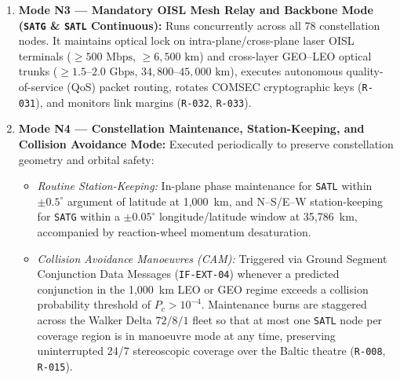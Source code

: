 \documentclass[11pt,a4paper]{article}
\providecommand{\abbr}[1]{#1}
\begin{document}
\begin{enumerate}
\begin{itemize}
        \item \emph{Synchronized Stereoscopic Tracking and Onboard Preliminary 3D Trajectory Computation (\texttt{R-023}):} Both \texttt{SATL} spacecraft track the ascending boost/post-boost vehicle at $20\text{--}50\text{ Hz}$ and exchange GNSS-synchronized timestamped \abbr{LOS} unit vectors and attitude/position covariance matrices over the $1,550\text{ nm}$ laser \abbr{OISL} mesh. This enables the primary \texttt{SATL} node to compute a real-time \emph{Onboard Preliminary Trajectory} estimate via dual-satellite stereoscopic triangulation (\texttt{R-023}).
        \item \emph{Encrypted Dual-Product Downlink (\texttt{R-012}, \texttt{R-023}, \texttt{R-033}):} Both cued \texttt{SATL} nodes stream their timestamped \emph{LEO Observation Packages} together with the \emph{Onboard Preliminary Trajectory} estimate via direct ground downlink or cross-layer \abbr{OISL} relay to the Ground Segment Data Processing System (\texttt{123456.02.04}) for authoritative multi-sensor ground fusion and automated preliminary warning dispatch within $\le 60\text{ s}$ end-to-end (\texttt{R-011}, \texttt{R-026}, \texttt{R-027}, \texttt{R-045}).
    \end{itemize}
    \item \textbf{Mode N3 --- Mandatory \abbr{OISL} Mesh Relay and Backbone Mode (\texttt{SATG} \& \texttt{SATL} Continuous):} Runs concurrently across all 78 constellation nodes. It maintains optical lock on intra-plane/cross-plane laser \abbr{OISL} terminals ($\ge 500\text{ Mbps}$, $\ge 6{,}500\text{ km}$) and cross-layer \abbr{GEO}--\abbr{LEO} optical trunks ($\ge 1.5\text{--}2.0\text{ Gbps}$, $34{,}800\text{--}45{,}000\text{ km}$), executes autonomous quality-of-service (\abbr{QoS}) packet routing, rotates \abbr{COMSEC} cryptographic keys (\texttt{R-031}), and monitors link margins (\texttt{R-032}, \texttt{R-033}).
    \item \textbf{Mode N4 --- Constellation Maintenance, Station-Keeping, and Collision Avoidance Mode:} Executed periodically to preserve constellation geometry and orbital safety:
    \begin{itemize}
        \item \emph{Routine Station-Keeping:} In-plane phase maintenance for \texttt{SATL} within $\pm 0.5^\circ$ argument of latitude at 1,000~km, and N--S/E--W station-keeping for \texttt{SATG} within a $\pm 0.05^\circ$ longitude/latitude window at 35,786~km, accompanied by reaction-wheel momentum desaturation.
        \item \emph{Collision Avoidance Manoeuvres (\abbr{CAM}):} Triggered via Ground Segment Conjunction Data Messages (\texttt{IF-EXT-04}) whenever a predicted conjunction in the 1,000~km \abbr{LEO} or \abbr{GEO} regime exceeds a collision probability threshold of $P_c > 10^{-4}$. Maintenance burns are staggered across the Walker Delta $72/8/1$ fleet so that at most one \texttt{SATL} node per coverage region is in manoeuvre mode at any time, preserving uninterrupted 24/7 stereoscopic coverage over the Baltic theatre (\texttt{R-008}, \texttt{R-015}).

\end{itemize}
\end{enumerate}
\end{document}
